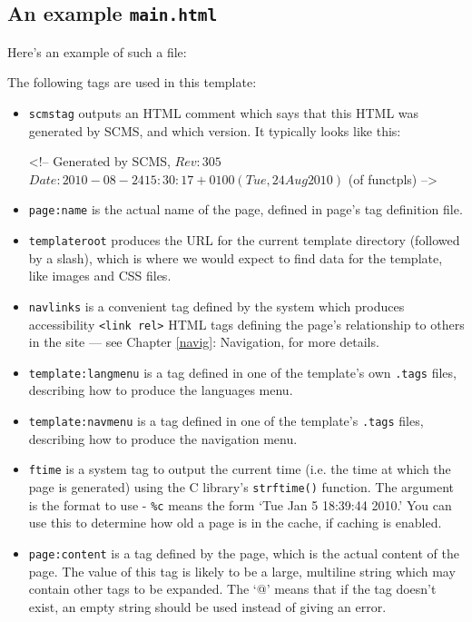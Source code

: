 \subsection{An example \texttt{main.html}}
\label{samplemain}
Here's an example of such a file:
The following tags are used in this template:
\begin{itemize}
\item \texttt{scmstag} outputs an HTML comment which says that this HTML 
was generated by SCMS, and which version. It typically looks like this:
\begin{MyVerbatim}
<!-- Generated by SCMS, $Rev: 305 $ $Date: 2010-08-24
    15:30:17 +0100 (Tue, 24 Aug 2010) $ (of functpls) -->
\end{MyVerbatim}
\item \texttt{page:name} is the actual name of the page, defined in page's tag definition file.
\item \texttt{templateroot} produces the URL for the current template directory (followed by a slash),
which is where we would expect to find data for the template, like images and CSS files.
\item \texttt{navlinks} is a convenient tag defined by the system which produces accessibility
\texttt{<link rel>} HTML tags defining the page's relationship to others in the site --- see 
Chapter \ref{navig}: Navigation, for more details.
\item \texttt{template:langmenu} is a tag defined in one of the template's own \texttt{.tags} files,
describing how to produce the languages menu.
\item \texttt{template:navmenu} is a tag defined in one of the template's \texttt{.tags} files, describing
how to produce the navigation menu.
\item \texttt{ftime} is a system tag to output the current time (i.e. the time at which the page is
generated) using the C library's \texttt{strftime()} function. The argument is the format to
use - \texttt{\%c} means the form `Tue Jan 5 18:39:44 2010.' You can use this to determine how old a page
is in the cache, if caching is enabled.
\item \texttt{page:content} is a tag defined by the page, which is the actual content of the page. The
value of this tag is likely to be a large, multiline string which may contain other tags to be expanded.
The `@' means that if the tag doesn't exist, an empty string should be used instead of giving an error.
\end{itemize}

